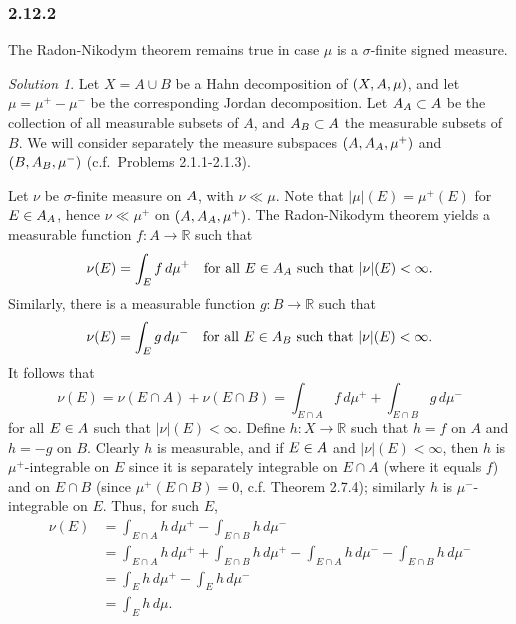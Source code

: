 \documentclass{report}
\newcommand{\bb}[1]{\mathbb{#1}}
\let\cal\relax
\newcommand{\cal}[1]{\mathcal{#1}}
\theoremstyle{remark}
\newtheorem*{solution}{Solution}
\begin{document}
\subsubsection*{2.12.2}
The Radon-Nikodym theorem remains true in case $\mu$ is a $\sigma$-finite signed measure.

\begin{solution}
  Let $X = A \cup B$ be a Hahn decomposition of $(X, \cal A, \mu)$, and let $\mu = \mu^+ - \mu^-$ be the corresponding Jordan decomposition. Let $\cal A_A \subset \cal A$ be the collection of all measurable subsets of $A$, and $\cal A_B \subset \cal A$ the measurable subsets of $B$. We will consider separately the measure subspaces $(A, \cal A_A, \mu^+)$ and $(B, \cal A_B, \mu^-)$ (c.f.\ Problems 2.1.1-2.1.3).

  Let $\nu$ be $\sigma$-finite measure on $\cal A$, with $\nu \ll \mu$. Note that $|\mu|(E) = \mu^+(E)$ for $E \in \cal A_A$, hence $\nu \ll \mu^+$ on $(A, \cal A_A, \mu^+)$. The Radon-Nikodym theorem yields a measurable function $f: A \to \bb R$ such that
  \begin{equation*}
    \nu(E) = \int_E f \, d\mu^+ \quad \text{for all $E \in \cal A_A$ such that $|\nu|(E) < \infty$.}
  \end{equation*}
  Similarly, there is a measurable function $g: B \to \bb R$ such that
  \begin{equation*}
    \nu(E) = \int_E g \, d\mu^- \quad \text{for all $E \in \cal A_B$ such that $|\nu|(E) < \infty$.}
  \end{equation*}
  It follows that
  \begin{equation*}
    \nu(E) = \nu(E \cap A) + \nu(E \cap B) = \int_{E \cap A} f \, d\mu^+ + \int_{E \cap B} g \, d\mu^-
  \end{equation*}
  for all $E \in \cal A$ such that $|\nu|(E) < \infty$. Define $h: X \to \bb R$ such that $h = f$ on $A$ and $h = -g$ on $B$. Clearly $h$ is measurable, and if $E \in \cal A$ and $|\nu|(E) < \infty$, then $h$ is $\mu^+$-integrable on $E$ since it is separately integrable on $E \cap A$ (where it equals $f$) and on $E \cap B$ (since $\mu^+(E \cap B) = 0$, c.f. Theorem 2.7.4); similarly $h$ is $\mu^-$-integrable on $E$. Thus, for such $E$,
  \begin{equation*}
    \begin{split}
      \nu(E) &= \int_{E \cap A} h \, d\mu^+ - \int_{E \cap B} h \, d\mu^- \\
      &= \int_{E \cap A} h \, d\mu^+ + \int_{E \cap B} h \, d\mu^+ - \int_{E \cap A} h \, d\mu^- - \int_{E \cap B} h \, d\mu^- \\
      &= \int_E h \, d\mu^+ - \int_E h \, d\mu^- \\
      &= \int_E h \, d\mu.
    \end{split}
  \end{equation*}


\end{solution}
\end{document}
